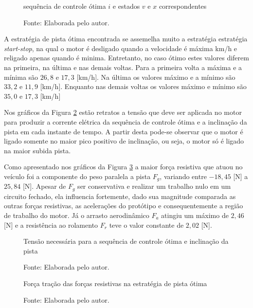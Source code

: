 \begin{figure}[H]
    \centering
    \caption{sequência de controle ótima $i$ e estados $v$ e $x$ correspondentes}
    
    \label{graf:resultadoOCP}
    \caption*{\footnotesize{Fonte: Elaborada pelo autor.}}
\end{figure}

A estratégia de pista ótima encontrada se assemelha muito a estratégia estratégia \textit{start-stop}, na qual o motor é desligado quando a velocidade é máxima
km/h e religado apenas quando é minima. Entretanto, no caso ótimo estes valores diferem na primeira, na última e nas demais voltas. Para a primeira volta a máxima e a mínima são
$26,8$ e $17,3$ [km/h]. Na última  os valores máximo e a mínimo são $33,2$ e $11,9$ [km/h]. Enquanto nas demais voltas os valores máximo e mínimo são $35,0$ e $17,3$ [km/h]

Nos gráficos da Figura \ref{graf:resultadotensao} estão retratos a tensão que deve ser aplicada no motor para produzir a corrente elétrica da sequência de controle ótima e a inclinação da pista em cada instante de tempo.
A partir desta pode-se observar que o motor é ligado somente no maior pico positivo de inclinação, ou seja, o motor só é ligado na maior subida pista.

Como apresentado nos gráficos da Figura \ref{graf:resultadoForcas} a maior força resistiva que atuou no veículo foi a componente do peso paralela a pista $F_g$, variando entre $-18,45$ [N] a $25,84$ [N]. Apesar de $F_g$ ser conservativa
e realizar um trabalho nulo em um circuito fechado, ela influencia fortemente, dado sua magnitude comparada as outras forças resistivas, as acelerações do protótipo e consequentemente a região de trabalho do motor.
Já o arrasto aerodinâmico $F_a$ atingiu um máximo de $2,46$ [N] e a resistência ao rolamento $F_r$ teve o valor constante de $2,02$ [N].  

\begin{figure}[h]
    \centering
    \caption{Tensão necessária para a sequência de controle ótima e inclinação da pista}
    
    \label{graf:resultadotensao}
    \caption*{\footnotesize{Fonte: Elaborada pelo autor.}}
\end{figure}

\begin{figure}[h]
    \centering
    \caption{Força tração das forças resistivas na estratégia de pista ótima}
    
    \label{graf:resultadoForcas}
    \caption*{\footnotesize{Fonte: Elaborada pelo autor.}}
\end{figure}







\clearpage